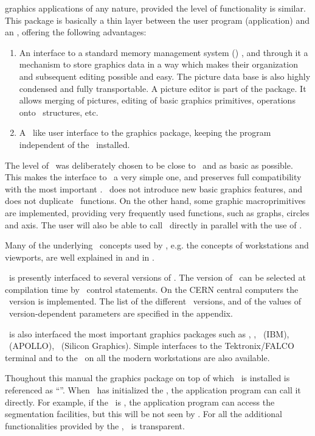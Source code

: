 graphics applications of any nature, provided the level of functionality is 
similar. This package is basically a
thin layer between the user program (application) and an \UGP, offering the
following advantages:
\begin{enumerate}
\item An interface to a standard memory management system (\ZEBRA)
      \cite{bib-ZEBRA}, and through it a mechanism to store graphics data in a
      way which makes their organization and subsequent editing possible and 
      easy. The picture data base is also highly condensed and fully
      transportable. A picture editor is part of the package. It allows merging
      of pictures, editing of basic graphics primitives, operations onto 
      \HIGZ~structures, etc.
\item A \GKS~like user interface to the graphics package, keeping the program
      independent of the \UGP~installed.
\end{enumerate}
The level of \HIGZ~was deliberately chosen to be close to \GKS~and as basic as
possible. This makes the interface to \GKS~a very simple one, and preserves
full compatibility with the most important \UGPs. \HIGZ~does not introduce new
basic graphics features, and does not duplicate \GKS~functions. On the other
hand, some graphic macroprimitives are implemented, providing very frequently
used functions, such as graphs, circles and axis. The user will also be able to
call \GKS~directly in parallel with the use of \HIGZ.
 
Many of the underlying \GKS~concepts used by \HIGZ, e.g. the concepts of 
workstations and viewports, are well explained in \cite{bib-GKS1} and in
\cite{bib-GKS2}.
 
\HIGZ~is presently interfaced to several versions of \GKS. The version of 
\GKS~can be selected at compilation time by \PATCHY~control statements. On the
CERN central computers the \GKSGRAL~version is implemented. The list of the
different \GKS~versions, and of the values of \GKS~version-dependent 
parameters are specified in the appendix.
 
\HIGZ~is also interfaced the most important graphics packages such as \PHIGS,
, \GDDM~(IBM), \GPR~(APOLLO), \GL~(Silicon Graphics).
Simple interfaces to the Tektronix/FALCO terminal and to the \XW~on
all the modern workstations are also available.
 
Thoughout this manual the graphics package on top of which \HIGZ~is installed is
referenced as ``\UGP''. When \HIGZ~has initialized the \UGP, the application 
program can call it directly. For example, if the \UGP~is \GKS, the application
program can access the segmentation facilities, but this will be not seen by 
\HIGZ. For all the additional functionalities provided by the \UGP, \HIGZ~is
transparent.
 
